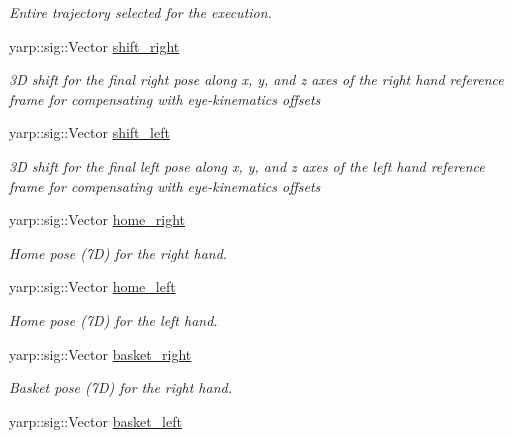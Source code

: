 \begin{DoxyCompactItemize}
\begin{DoxyCompactList}\small\item\em Entire trajectory selected for the execution. \end{DoxyCompactList}\item 
yarp\+::sig\+::\+Vector \hyperlink{classGraspExecution_a1baf57f3fabc9fd56eec77facb4bf478}{shift\+\_\+right}\label{classGraspExecution_a1baf57f3fabc9fd56eec77facb4bf478}

\begin{DoxyCompactList}\small\item\em 3D shift for the final right pose along x, y, and z axes of the right hand reference frame for compensating with eye-\/kinematics offsets \end{DoxyCompactList}\item 
yarp\+::sig\+::\+Vector \hyperlink{classGraspExecution_af2e560a2d96db54461f13fdab0b47954}{shift\+\_\+left}\label{classGraspExecution_af2e560a2d96db54461f13fdab0b47954}

\begin{DoxyCompactList}\small\item\em 3D shift for the final left pose along x, y, and z axes of the left hand reference frame for compensating with eye-\/kinematics offsets \end{DoxyCompactList}\item 
yarp\+::sig\+::\+Vector \hyperlink{classGraspExecution_af020ee42122eed4eae529f45d4cd5a3d}{home\+\_\+right}\label{classGraspExecution_af020ee42122eed4eae529f45d4cd5a3d}

\begin{DoxyCompactList}\small\item\em Home pose (7D) for the right hand. \end{DoxyCompactList}\item 
yarp\+::sig\+::\+Vector \hyperlink{classGraspExecution_aeaab5ed9db8ee2bd6df59db48739976c}{home\+\_\+left}\label{classGraspExecution_aeaab5ed9db8ee2bd6df59db48739976c}

\begin{DoxyCompactList}\small\item\em Home pose (7D) for the left hand. \end{DoxyCompactList}\item 
yarp\+::sig\+::\+Vector \hyperlink{classGraspExecution_a482fb65886a13e0a88a15764047fc65b}{basket\+\_\+right}\label{classGraspExecution_a482fb65886a13e0a88a15764047fc65b}

\begin{DoxyCompactList}\small\item\em Basket pose (7D) for the right hand. \end{DoxyCompactList}\item 
yarp\+::sig\+::\+Vector \hyperlink{classGraspExecution_a1a28ab6787ec253f78675ffc7db46f5a}{basket\+\_\+left}\label{classGraspExecution_a1a28ab6787ec253f78675ffc7db46f5a}


\end{DoxyCompactItemize}

